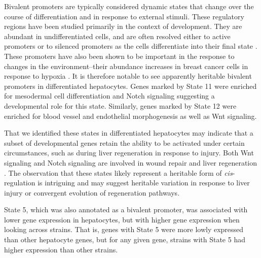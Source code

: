 \documentclass[
  11pt,
]{article}
\begin{document}
Bivalent promoters are typically considered dynamic states that change
over the course of differentiation and in response to external stimuli.
These regulatory regions have been studied primarily in the context of
development. They are abundant in undifferentiated cells, and are often
resolved either to active promoters or to silenced promoters as the
cells differentiate into their final state \citep{pmid23788621, 
pmid22513113}. These promoters have also been shown to be important in
the response to changes in the environment--their abundance increases in
breast cancer cells in response to hypoxia \citep{pmid27800026}. It is
therefore notable to see apparently heritable bivalent promoters in
differentiated hepatocytes. Genes marked by State 11 were enriched for
mesodermal cell differentiation and Notch signaling suggesting a
developmental role for this state. Similarly, genes marked by State 12
were enriched for blood vessel and endothelial morphogenesis as well as
Wnt signaling.

That we identified these states in differentiated hepatocytes may
indicate that a subset of developmental genes retain the ability to be
activated under certain circumstances, such as during liver regeneration
in response to injury. Both Wnt signaling and Notch signaling are
involved in wound repair \citep{shi2015wnt, 
chigurupati2007involvement, whyte2012wnt} and liver regeneration
\citep{yue2018role, hu2021wnt, thompson2007wnt}. The observation that
these states likely represent a heritable form of
\textit{cis}-regulation is intriguing and may suggest heritable
variation in response to liver injury or convergent evolution of
regeneration pathways.

State 5, which was also annotated as a bivalent promoter, was associated
with lower gene expression in hepatocytes, but with higher gene
expression when looking across strains. That is, genes with State 5 were
more lowly expressed than other hepatocyte genes, but for any given
gene, strains with State 5 had higher expression than other strains.
\end{document}

